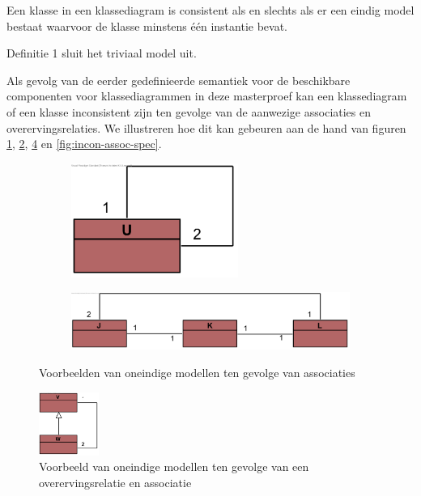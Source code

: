 \begin{definition}
Een klasse in een klassediagram is consistent als en slechts als er een eindig model bestaat waarvoor de klasse minstens \'e\'en instantie bevat.
\end{definition}

Definitie 1 sluit het triviaal model uit.

Als gevolg van de eerder gedefinieerde semantiek voor de beschikbare componenten voor klassediagrammen in deze masterproef kan een klassediagram of een klasse inconsistent zijn ten gevolge van de aanwezige associaties en overervingsrelaties. We illustreren hoe dit kan gebeuren aan de hand van figuren \ref{fig:incon-assoc-simple}, \ref{fig:incon-assoc-multi}, \ref{fig:incon-gen-assoc} en \ref{fig:incon-assoc-spec}.

\begin{figure}
	\hspace{-3cm}
	\centering
	\begin{subfigure}[b]{0.3\textwidth}
		\includegraphics[width=0.6\textwidth]{chap-consistentie/voorbeeld3.png}
		\caption{}
		\label{fig:incon-assoc-simple}
	\end{subfigure}%
	\begin{subfigure}[b]{0.3\textwidth}
		\includegraphics[width=2\textwidth]{chap-consistentie/voorbeeld4.png}
		\caption{}
		\label{fig:incon-assoc-multi}
	\end{subfigure}
	\caption{Voorbeelden van oneindige modellen ten gevolge van associaties}
	\label{fig:incon-assoc}
\end{figure}

\begin{figure}
	\centering
	\includegraphics[width=0.175\textwidth]{chap-consistentie/voorbeeld5.png}
	\caption{Voorbeeld van oneindige modellen ten gevolge van een overervingsrelatie en associatie}
	\label{fig:incon-gen-assoc}
\end{figure}

